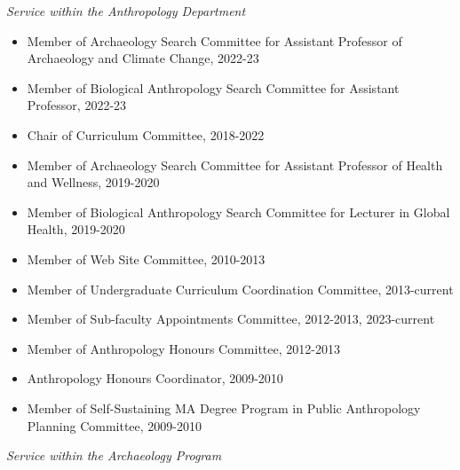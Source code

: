 
\medskip

\noindent\emph{Service within the Anthropology Department \vspace{0.01in}}

\medskip

\begin{itemize}[noitemsep, font=$\bullet$\scshape\bfseries]

\item Member of Archaeology Search Committee for Assistant Professor of Archaeology and Climate Change, 2022-23

\item Member of Biological Anthropology Search Committee for Assistant Professor, 2022-23

\item Chair of Curriculum Committee, 2018-2022 

\item Member of Archaeology Search Committee for Assistant Professor of Health and Wellness, 2019-2020 

\item Member of Biological Anthropology Search Committee for Lecturer in Global Health, 2019-2020 

\item Member of Web Site Committee, 2010-2013

\item Member of Undergraduate Curriculum Coordination Committee, 2013-current

\item Member of Sub-faculty Appointments Committee, 2012-2013, 2023-current

\item Member of Anthropology Honours Committee, 2012-2013

\item Anthropology Honours Coordinator, 2009-2010

\item Member of Self-Sustaining MA Degree Program in Public Anthropology Planning Committee, 2009-2010

\end{itemize}

\medskip

\noindent\emph{Service within the Archaeology Program \vspace{0.01in}}

